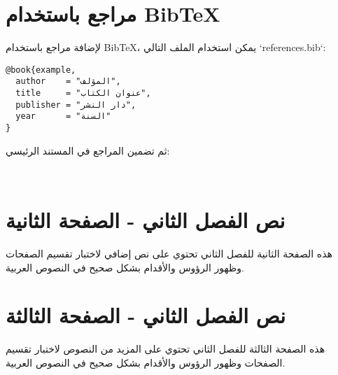 \newpage

\section{مراجع باستخدام BibTeX}
لإضافة مراجع باستخدام BibTeX، يمكن استخدام الملف التالي `references.bib`:

\begin{verbatim}
@book{example,
  author    = "المؤلف",
  title     = "عنوان الكتاب",
  publisher = "دار النشر",
  year      = "السنة"
}
\end{verbatim}

ثم تضمين المراجع في المستند الرئيسي:

\begin{verbatim}


\end{verbatim}

\newpage

\section{نص الفصل الثاني - الصفحة الثانية}

هذه الصفحة الثانية للفصل الثاني تحتوي على نص إضافي لاختبار تقسيم الصفحات وظهور الرؤوس والأقدام بشكل صحيح في النصوص العربية.

\newpage

\section{نص الفصل الثاني - الصفحة الثالثة}

هذه الصفحة الثالثة للفصل الثاني تحتوي على المزيد من النصوص لاختبار تقسيم الصفحات وظهور الرؤوس والأقدام بشكل صحيح في النصوص العربية.
